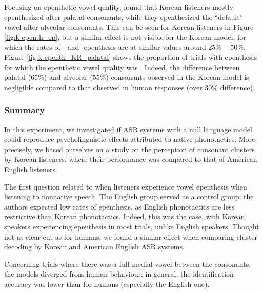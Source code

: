 {Focusing on epenthetic vowel quality, \cite{durvasula2015} found that Korean listeners mostly epenthesized \textipa{[i]} after palatal consonants, while they epenthesized the ``default'' vowel \textipa{[1]} after alveolar consonants. This can be seen for Korean listeners in Figure \ref{fig:k-epenth_ep}, but a similar effect is not visible for the Korean model, for which the rates of - and -epenthesis are at similar values around $25\% - 50\%$. Figure \ref{fig:k-epenth_KR_palatal} shows the proportion of trials with epenthesis for which the epenthetic vowel quality was . Indeed, the difference between palatal ($65\%$) and alveolar ($55\%$) consonants observed in the Korean model is negligible compared to that observed in human responses (over $30\%$ difference).  

\subsubsection{Summary}
In this experiment, we investigated if ASR systems with a null language model could reproduce psycholinguistic effects attributed to native phonotactics. More precisely, we based ourselves on a study on the perception of consonant clusters by Korean listeners, where their performance was compared to that of American English listeners.

The first question related to when listeners experience vowel epenthesis when listening to nonnative speech. 
The English group served as a control group; the authors expected low rates of epenthesis, as English phonotactics are less restrictive than Korean phonotactics. Indeed, this was the case, with Korean speakers experiencing epenthesis in most trials, unlike English speakers. Thought not as clear cut as for humans, we found a similar effect when comparing cluster decoding by Korean and American English ASR systems.

Concerning trials where there was a full medial vowel between the consonants, the models diverged from human behaviour; in general, the identification accuracy was lower than for humans (especially the English one).

}
